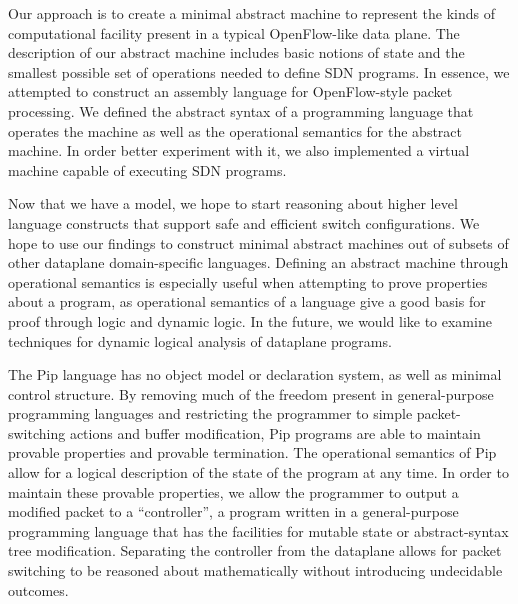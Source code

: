 Our approach is to create a minimal abstract machine to represent the kinds of computational facility present in a typical OpenFlow-like data plane.
The description of our abstract machine includes basic notions of state and the smallest possible set of operations needed to define SDN programs.
In essence, we attempted to construct an assembly language for OpenFlow-style packet processing. We defined the abstract syntax of a programming language that operates the machine as well as the operational semantics for the abstract machine. In order better experiment with it, we also implemented a virtual machine capable of executing SDN programs.

Now that we have a model, we hope to start reasoning about higher level language constructs that support safe and efficient switch configurations. We hope to use our findings to construct minimal abstract machines out of subsets of other dataplane domain-specific languages. Defining an abstract machine through operational semantics is especially useful when attempting to prove properties about a program, as operational semantics of a language give a good basis for proof through logic and dynamic logic. In the future, we would like to examine techniques for dynamic logical analysis of dataplane programs.


The Pip language has no object model or declaration system, as well as minimal control structure. By removing much of the freedom present in general-purpose programming languages and restricting the programmer to simple packet-switching actions and buffer modification, Pip programs are able to maintain provable properties and provable termination. The operational semantics of Pip allow for a logical description of the state of the program at any time. In order to maintain these provable properties, we allow the programmer to output a modified packet to a ``controller'', a program written in a general-purpose programming language that has the facilities for mutable state or abstract-syntax tree modification. Separating the controller from the dataplane allows for packet switching to be reasoned about mathematically without introducing undecidable outcomes.

